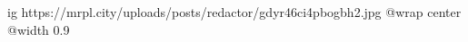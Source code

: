  
 
 
 
 

\ifcmt
  ig https://mrpl.city/uploads/posts/redactor/gdyr46ci4pbogbh2.jpg
  @wrap center
  @width 0.9
\fi
